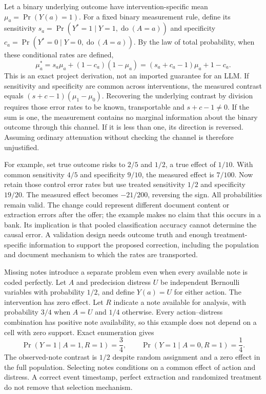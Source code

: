 Let a binary underlying outcome have intervention-specific mean
$\mu_a=\Pr(Y(a)=1)$. For a fixed binary measurement rule, define its
sensitivity $s_a=\Pr(Y^*=1\mid Y=1,\operatorname{do}(A=a))$ and specificity
$c_a=\Pr(Y^*=0\mid Y=0,\operatorname{do}(A=a))$. By the law of total
probability, when these conditional rates are defined,
\begin{equation}
 \mu_a^*=s_a\mu_a+(1-c_a)(1-\mu_a)
          =(s_a+c_a-1)\mu_a+1-c_a.
 \label{exec17:l2-error}
\end{equation}
This is an exact project derivation, not an imported guarantee for an LLM.
If sensitivity and specificity are common across interventions, the measured
contrast equals $(s+c-1)(\mu_1-\mu_0)$. Recovering the underlying contrast
by division requires those error rates to be known, transportable and
$s+c-1\ne0$. If the sum is one, the measurement contains no marginal
information about the binary outcome through this channel. If it is less
than one, its direction is reversed. Assuming ordinary attenuation without
checking the channel is therefore unjustified.

For example, set true outcome risks to $2/5$ and $1/2$, a true effect of
$1/10$. With common sensitivity $4/5$ and specificity $9/10$, the measured
effect is $7/100$. Now retain those control error rates but use treated
sensitivity $1/2$ and specificity $19/20$. The measured effect becomes
$-21/200$, reversing the sign. All probabilities remain valid. The change
could represent different document content or extraction errors after the
offer; the example makes no claim that this occurs in a bank. Its implication
is that pooled classification accuracy cannot determine the causal error.
A validation design needs outcome truth and enough treatment-specific
information to support the proposed correction, including the population
and document mechanism to which the rates are transported.

Missing notes introduce a separate problem even when every available note
is coded perfectly. Let $A$ and predecision distress $U$ be independent
Bernoulli variables with probability $1/2$, and define $Y(a)=U$ for either
action. The intervention has zero effect. Let $R$ indicate a note available
for analysis, with probability $3/4$ when $A=U$ and $1/4$ otherwise.
Every action--distress combination has positive note availability, so this
example does not depend on a cell with zero support. Exact enumeration gives
\begin{equation}
 \Pr(Y=1\mid A=1,R=1)=\frac34,\qquad
 \Pr(Y=1\mid A=0,R=1)=\frac14.
 \label{exec17:l2-selection}
\end{equation}
The observed-note contrast is $1/2$ despite random assignment and a zero
effect in the full population. Selecting notes conditions on a common effect
of action and distress. A correct event timestamp, perfect extraction and
randomized treatment do not remove that selection mechanism.

